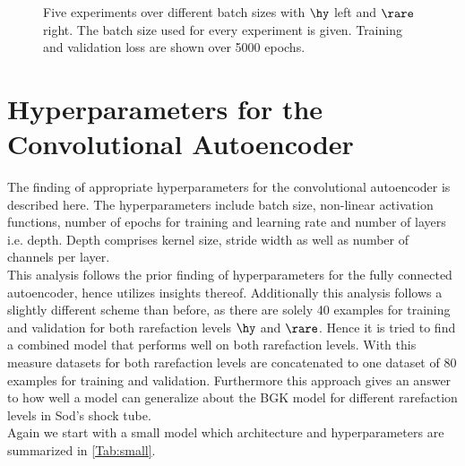 \begin{figure}[H]
	
	
		\caption{Five experiments over different batch sizes with $\hy$ left and $\rare$ right. The batch size used for every experiment is given. Training and validation loss are shown over 5000 epochs.}
\end{figure}\label{Fig:Activations}
\chapter{Hyperparameters for the Convolutional Autoencoder}
\label{Ch:ApB}

The finding of appropriate hyperparameters for the convolutional autoencoder is described here. The hyperparameters include  batch size, non-linear activation functions, number of epochs for training and learning rate and number of layers i.e. depth. Depth comprises kernel size, stride width as well as number of channels per layer.\\
This analysis follows the prior finding of hyperparameters for the fully connected autoencoder, hence utilizes insights thereof. Additionally this analysis follows a slightly different scheme than before, as there are solely 40 examples for training and validation for both rarefaction levels \(\hy\) and \(\rare\). Hence it is tried to find a combined model that performs well on both rarefaction levels. With this measure datasets for both rarefaction levels are concatenated to one dataset of 80 examples for training and validation. Furthermore this approach gives an answer to how well a model can generalize about the BGK model for different rarefaction levels in Sod's shock tube.\\
Again we start with a small model which architecture and hyperparameters are summarized in \cref{Tab:small}.
